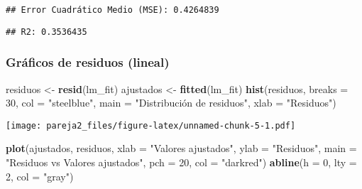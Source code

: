 \documentclass[
]{article}
\newenvironment{Shaded}{\begin{snugshade}}{\end{snugshade}}
\newcommand{\AttributeTok}[1]{\textcolor[rgb]{0.13,0.29,0.53}{#1}}
\newcommand{\DecValTok}[1]{\textcolor[rgb]{0.00,0.00,0.81}{#1}}
\newcommand{\FunctionTok}[1]{\textcolor[rgb]{0.13,0.29,0.53}{\textbf{#1}}}
\newcommand{\NormalTok}[1]{#1}
\newcommand{\OtherTok}[1]{\textcolor[rgb]{0.56,0.35,0.01}{#1}}
\newcommand{\SpecialCharTok}[1]{\textcolor[rgb]{0.81,0.36,0.00}{\textbf{#1}}}
\newcommand{\StringTok}[1]{\textcolor[rgb]{0.31,0.60,0.02}{#1}}
\begin{document}
\begin{verbatim}
## Error Cuadrático Medio (MSE): 0.4264839
\end{verbatim}

\begin{Shaded}
\end{Shaded}

\begin{verbatim}
## R2: 0.3536435
\end{verbatim}

\hypertarget{gruxe1ficos-de-residuos-lineal}{%
\subsubsection{Gráficos de residuos
(lineal)}\label{gruxe1ficos-de-residuos-lineal}}

\begin{Shaded}
\begin{Highlighting}[]
\NormalTok{residuos }\OtherTok{\textless{}{-}} \FunctionTok{resid}\NormalTok{(lm\_fit)}
\NormalTok{ajustados }\OtherTok{\textless{}{-}} \FunctionTok{fitted}\NormalTok{(lm\_fit)}
\FunctionTok{hist}\NormalTok{(residuos, }\AttributeTok{breaks =} \DecValTok{30}\NormalTok{, }\AttributeTok{col =} \StringTok{"steelblue"}\NormalTok{, }\AttributeTok{main =} \StringTok{"Distribución de residuos"}\NormalTok{, }\AttributeTok{xlab =} \StringTok{"Residuos"}\NormalTok{)}
\end{Highlighting}
\end{Shaded}

\texttt{[image: pareja2\_files/figure-latex/unnamed-chunk-5-1.pdf]}

\begin{Shaded}
\begin{Highlighting}[]
\FunctionTok{plot}\NormalTok{(ajustados, residuos, }\AttributeTok{xlab =} \StringTok{"Valores ajustados"}\NormalTok{, }\AttributeTok{ylab =} \StringTok{"Residuos"}\NormalTok{, }\AttributeTok{main =} \StringTok{"Residuos vs Valores ajustados"}\NormalTok{, }\AttributeTok{pch =} \DecValTok{20}\NormalTok{, }\AttributeTok{col =} \StringTok{"darkred"}\NormalTok{)}
\FunctionTok{abline}\NormalTok{(}\AttributeTok{h =} \DecValTok{0}\NormalTok{, }\AttributeTok{lty =} \DecValTok{2}\NormalTok{, }\AttributeTok{col =} \StringTok{"gray"}\NormalTok{)}
\end{Highlighting}
\end{Shaded}
\end{document}
